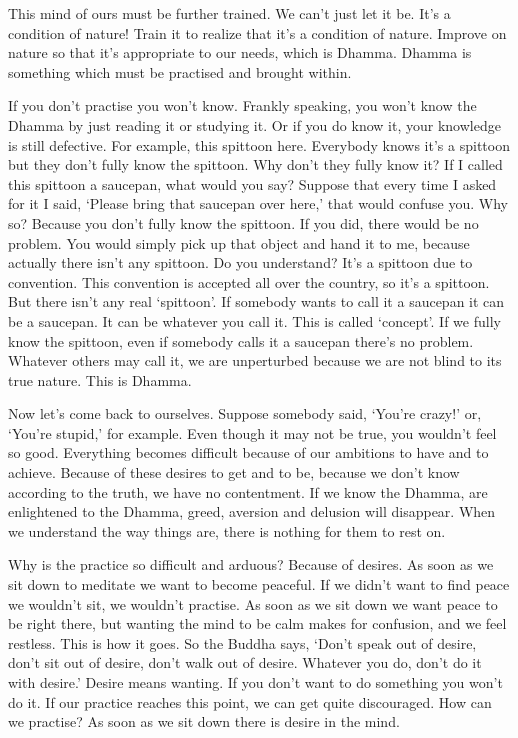 This mind of ours must be further trained. We can't just let it be. It's a condition of nature! Train it to realize that it's a condition of nature. Improve on nature so that it's appropriate to our needs, which is Dhamma. Dhamma is something which must be practised and brought within.

If you don't practise you won't know. Frankly speaking, you won't know the Dhamma by just reading it or studying it. Or if you do know it, your knowledge is still defective. For example, this spittoon here. Everybody knows it's a spittoon but they don't fully know the spittoon. Why don't they fully know it? If I called this spittoon a saucepan, what would you say? Suppose that every time I asked for it I said, `Please bring that saucepan over here,' that would confuse you. Why so? Because you don't fully know the spittoon. If you did, there would be no problem. You would simply pick up that object and hand it to me, because actually there isn't any spittoon. Do you understand? It's a spittoon due to convention. This convention is accepted all over the country, so it's a spittoon. But there isn't any real `spittoon'. If somebody wants to call it a saucepan it can be a saucepan. It can be whatever you call it. This is called `concept'. If we fully know the spittoon, even if somebody calls it a saucepan there's no problem. Whatever others may call it, we are unperturbed because we are not blind to its true nature. This is  Dhamma.

Now let's come back to ourselves. Suppose somebody said, `You're crazy!' or, `You're stupid,' for example. Even though it may not be true, you wouldn't feel so good. Everything becomes difficult because of our ambitions to have and to achieve. Because of these desires to get and to be, because we don't know according to the truth, we have no contentment. If we know the Dhamma, are enlightened to the Dhamma, greed, aversion and delusion will disappear. When we understand the way things are, there is nothing for them to rest on.

Why is the practice so difficult and arduous? Because of desires. As soon as we sit down to meditate we want to become peaceful. If we didn't want to find peace we wouldn't sit, we wouldn't practise. As soon as we sit down we want peace to be right there, but wanting the mind to be calm makes for confusion, and we feel restless. This is how it goes. So the Buddha says, `Don't speak out of desire, don't sit out of desire, don't walk out of desire. Whatever you do, don't do it with desire.' Desire means wanting. If you don't want to do something you won't do it. If our practice reaches this point, we can get quite discouraged. How can we practise? As soon as we sit down there is desire in the mind.

